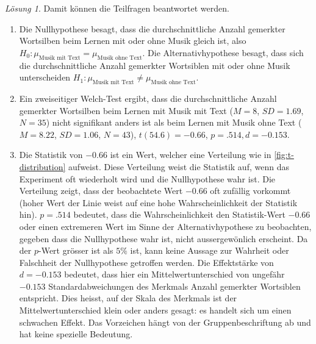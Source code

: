 \documentclass[
]{book}
\providecommand{\tightlist}{%
  \setlength{\itemsep}{0pt}\setlength{\parskip}{0pt}}
\theoremstyle{definition}
\theoremstyle{definition}
\theoremstyle{definition}
\theoremstyle{definition}
\theoremstyle{remark}
\newtheorem*{solution}{Lösung}
\begin{document}
\begin{solution}
Damit können die Teilfragen beantwortet werden.

\begin{enumerate}
\def\labelenumi{\alph{enumi})}
\tightlist
\item
  Die Nullhypothese besagt, dass die durchschnittliche Anzahl gemerkter Wortsilben beim Lernen mit oder ohne Musik gleich ist, also \(H_0: \mu_\text{Musik mit Text} = \mu_\text{Musik ohne Text}\). Die Alternativhypothese besagt, dass sich die durchschnittliche Anzahl gemerkter Wortsiblen mit oder ohne Musik unterscheiden \(H_1: \mu_\text{Musik mit Text} \neq \mu_\text{Musik ohne Text}\).
\item
  Ein zweiseitiger Welch-Test ergibt, dass die durchschnittliche Anzahl gemerkter Wortsilben beim Lernen mit Musik mit Text (\(M = 8\), \(SD = 1.69\), \(N = 35\)) nicht signifikant anders ist als beim Lernen mit Musik ohne Text (\(M = 8.22\), \(SD = 1.06\), \(N = 43\)), \(t(54.6) = -0.66\), \(p = .514, d = -0.153\).
\item
  Die Statistik von \(-0.66\) ist ein Wert, welcher eine Verteilung wie in \ref{fig:t-distribution} aufweist. Diese Verteilung weist die Statistik auf, wenn das Experiment oft wiederholt wird und die Nullhypothese wahr ist. Die Verteilung zeigt, dass der beobachtete Wert \(-0.66\) oft zufällig vorkommt (hoher Wert der Linie weist auf eine hohe Wahrscheinlichkeit der Statistik hin). \(p = .514\) bedeutet, dass die Wahrscheinlichkeit den Statistik-Wert \(-0.66\) oder einen extremeren Wert im Sinne der Alternativhypothese zu beobachten, gegeben dass die Nullhypothese wahr ist, nicht aussergewönlich erscheint. Da der \(p\)-Wert grösser ist als \(5\%\) ist, kann keine Aussage zur Wahrheit oder Falschheit der Nullhypothese getroffen werden. Die Effektstärke von \(d = -0.153\) bedeutet, dass hier ein Mittelwertunterschied von ungefähr \(-0.153\) Standardabweichungen des Merkmals Anzahl gemerkter Wortsiblen entspricht. Dies heisst, auf der Skala des Merkmals ist der Mittelwertunterschied klein oder anders gesagt: es handelt sich um einen schwachen Effekt. Das Vorzeichen hängt von der Gruppenbeschriftung ab und hat keine spezielle Bedeutung.
\end{enumerate}

\end{solution}
\end{document}
